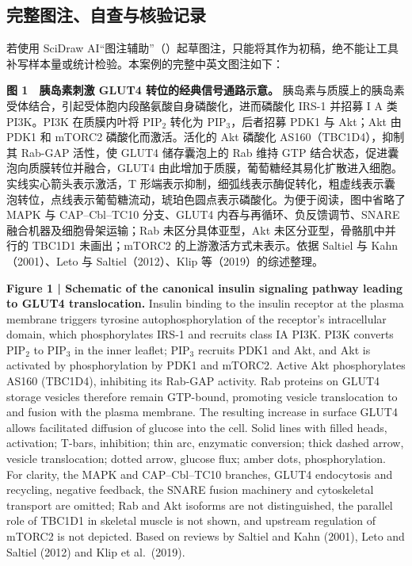 \subsection{完整图注、自查与核验记录}

若使用 SciDraw AI“图注辅助”（）起草图注，只能将其作为初稿，绝不能让工具补写样本量或统计检验。本案例的完整中英文图注如下：

\begin{BookNote}
\textbf{图 1　胰岛素刺激 GLUT4 转位的经典信号通路示意。} 胰岛素与质膜上的胰岛素受体结合，引起受体胞内段酪氨酸自身磷酸化，进而磷酸化 IRS-1 并招募 I A 类 PI3K。PI3K 在质膜内叶将 $\text{PIP}_2$ 转化为 $\text{PIP}_3$，后者招募 PDK1 与 Akt；Akt 由 PDK1 和 mTORC2 磷酸化而激活。活化的 Akt 磷酸化 AS160（TBC1D4），抑制其 Rab-GAP 活性，使 GLUT4 储存囊泡上的 Rab 维持 GTP 结合状态，促进囊泡向质膜转位并融合，GLUT4 由此增加于质膜，葡萄糖经其易化扩散进入细胞。实线实心箭头表示激活，T 形端表示抑制，细弧线表示酶促转化，粗虚线表示囊泡转位，点线表示葡萄糖流动，琥珀色圆点表示磷酸化。为便于阅读，图中省略了 MAPK 与 CAP–Cbl–TC10 分支、GLUT4 内吞与再循环、负反馈调节、SNARE 融合机器及细胞骨架运输；Rab 未区分具体亚型，Akt 未区分亚型，骨骼肌中并行的 TBC1D1 未画出；mTORC2 的上游激活方式未表示。依据 Saltiel 与 Kahn（2001）、Leto 与 Saltiel（2012）、Klip 等（2019）的综述整理。

\medskip
\textbf{Figure 1 | Schematic of the canonical insulin signaling pathway leading to GLUT4 translocation.} Insulin binding to the insulin receptor at the plasma membrane triggers tyrosine autophosphorylation of the receptor's intracellular domain, which phosphorylates IRS-1 and recruits class IA PI3K. PI3K converts $\text{PIP}_2$ to $\text{PIP}_3$ in the inner leaflet; $\text{PIP}_3$ recruits PDK1 and Akt, and Akt is activated by phosphorylation by PDK1 and mTORC2. Active Akt phosphorylates AS160 (TBC1D4), inhibiting its Rab-GAP activity. Rab proteins on GLUT4 storage vesicles therefore remain GTP-bound, promoting vesicle translocation to and fusion with the plasma membrane. The resulting increase in surface GLUT4 allows facilitated diffusion of glucose into the cell. Solid lines with filled heads, activation; T-bars, inhibition; thin arc, enzymatic conversion; thick dashed arrow, vesicle translocation; dotted arrow, glucose flux; amber dots, phosphorylation. For clarity, the MAPK and CAP–Cbl–TC10 branches, GLUT4 endocytosis and recycling, negative feedback, the SNARE fusion machinery and cytoskeletal transport are omitted; Rab and Akt isoforms are not distinguished, the parallel role of TBC1D1 in skeletal muscle is not shown, and upstream regulation of mTORC2 is not depicted. Based on reviews by Saltiel and Kahn (2001), Leto and Saltiel (2012) and Klip et al.\ (2019).
\end{BookNote}

